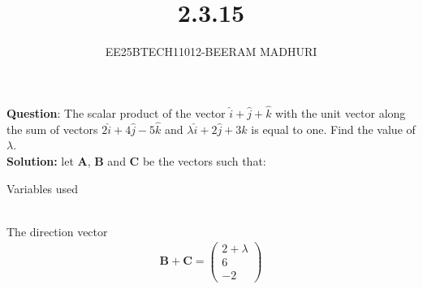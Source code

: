 \documentclass[journal]{IEEEtran}
\begin{document}

\vspace{3cm}

\title{2.3.15}
\author{EE25BTECH11012-BEERAM MADHURI}
{\let\newpage\relax\maketitle}

\renewcommand{\thefigure}{\theenumi}
\renewcommand{\thetable}{\theenumi}
\setlength{\intextsep}{10pt} %


\renewcommand{\thetable}{\theenumi}


\textbf{Question}:
The scalar product of the vector $\hat{i}+\hat{j}+\hat{k}$ with the unit vector along the sum of vectors $2\hat{i} + 4\hat{j} - 5\hat{k}$ and $\lambda \hat{i} + 2\hat{j} + 3\hat{k}$ is equal to one. Find the value of $\lambda$.\\
\textbf{Solution: }
let $\mathbf{A}$, $\mathbf{B}$ and $\mathbf{C}$ be the vectors such that:
\begin{table}[h!]
    \centering
    
    \caption{Variables used}
    \label{table 1.9.1}
\end{table}\\
The direction vector
\begin{align}\mathbf{B}+\mathbf{C} = \begin{pmatrix} 2+\lambda \\ 6 \\ -2 \end{pmatrix}
\end{align}
\end{document}
